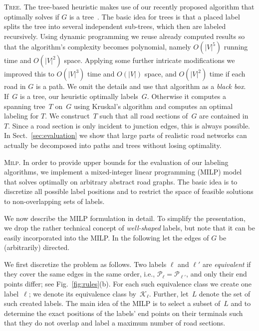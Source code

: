 \documentclass[a4paper,11pt]{article}
\newcommand{\myparagraph}[1]{\vspace*{.8ex}\noindent #1}
\newcommand{\TreeAlgo}{\textsc{Tree}\xspace}
\newcommand{\ILPAlgo}{\textsc{Milp}\xspace}
\begin{document}
\myparagraph{\TreeAlgo.}
The tree-based heuristic makes use of our recently proposed algorithm 
that optimally solves \MaxTotalCovering if $G$ is a tree~\cite{rlTheory}. The basic idea for trees is that a
placed label splits the tree into several independent sub-trees, which then are
labeled recursively. Using dynamic programming we reuse already
computed results so that the algorithm's complexity becomes
polynomial, namely $O(|V|^5)$ running time and $O(|V|^2)$ space. Applying
some further intricate modifications we improved this to $O(|V|^3)$ time
and $O(|V|)$ space, and $O(|V|^2)$ time if each road in $G$ is a path. We omit the details and use that algorithm as a \emph{black
  box}. If~$G$ is a tree, our heuristic optimally labels~$G$. Otherwise it computes
a spanning tree~$T$ on~$G$ using Kruskal's algorithm and computes an
optimal labeling for $T$. We
construct~$T$ such that all road sections of~$G$ are contained
in~$T$. Since a road section is only incident to junction edges, this
is always possible. In
Sect.~\ref{sec:evaluation} we show that large parts of realistic road
networks can actually be decomposed into paths and trees without losing
optimality. 



\myparagraph{\ILPAlgo.} In order to provide upper bounds for the
evaluation of our labeling algorithms, we implement a mixed-integer linear programming (MILP) model that solves \MaxTotalCovering optimally on arbitrary abstract road
graphs. The basic idea is to discretize all possible label positions and to
restrict the space of feasible solutions to non-overlapping sets of
labels.


We now describe the MILP formulation in detail. To simplify the
presentation, we drop the rather technical concept of
\emph{well-shaped} labels, but note that it can be easily incorporated
into the MILP. In the following let the edges of $G$ be (arbitrarily)
directed.

We first discretize the problem as follows. Two labels $\ell$ and
$\ell'$ are \emph{equivalent} if they cover the same edges in the same
order, i.e., $\mathcal P_\ell=\mathcal P_{\ell'}$, and only their end points differ; see
Fig.~\ref{fig:rules}(b).  For
each such equivalence class we create one label~$\ell$; we denote its
equivalence class by~$\mathcal K_\ell$. Further, let~$L$ denote the
set of such created labels.  The main idea of the MILP is to
select a subset of~$L$ and to determine the exact positions of the
labels' end points on their terminals such that they do not overlap
and label a maximum number of road sections.
\end{document}
